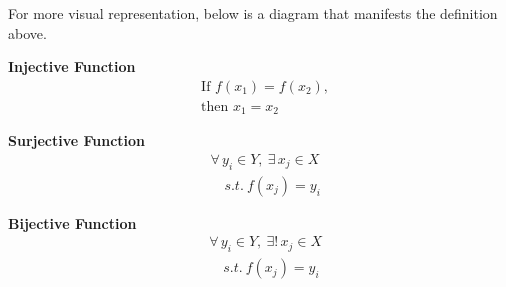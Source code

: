 \documentclass[../../main.tex]{subfiles}
\begin{document}
For more visual representation, below is a diagram that manifests
the definition above.

\begin{minipage}{0.32\textwidth}
\begin{center}
\textbf{Injective Function}
\begin{align*}
    &\text{If } f(x_1) = f(x_2), \\
    &\text{then } x_1 = x_2
\end{align*}
\end{center}
\end{minipage}
\begin{minipage}{0.32\textwidth}
\begin{center}
\textbf{Surjective Function}
\begin{align*}
    &\forall\, y_i \in Y,\ \exists\, x_j \in X \\
    &\quad s.t.\ f(x_j) = y_i
\end{align*}
\end{center}
\end{minipage}
\begin{minipage}{0.32\textwidth}
\begin{center}
\textbf{Bijective Function}
\begin{align*}
    &\forall\, y_i \in Y,\ \exists!\, x_j \in X \\
    &\quad s.t.\ f(x_j) = y_i
\end{align*}
\end{center}
\end{minipage}
\end{document}
